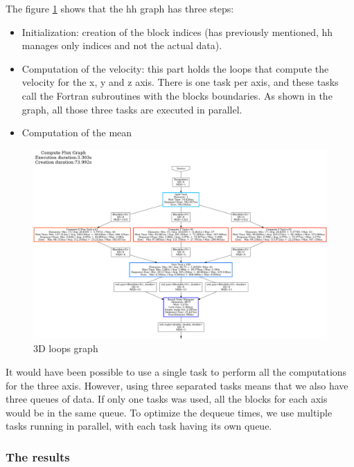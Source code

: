 The figure \ref{fig:loopsgraph} shows that the \gls{hh} graph has three steps:

\begin{itemize}
  \item Initialization: creation of the block indices (has previously
    mentioned, \gls{hh} manages only indices and not the actual data).
  \item Computation of the velocity: this part holds the loops that compute the
    velocity for the x, y and z axis. There is one task per axis, and these
    tasks call the Fortran subroutines with the blocks boundaries. As shown in
    the graph, all those three tasks are executed in parallel.
  \item Computation of the mean
\end{itemize}
\clearpage{}

\begin{figure}[h!]
  \begin{center}
    \includegraphics[scale=0.2]{img/fds-loops/graph-61.png}
    \caption{3D loops graph}
    \label{fig:loopsgraph}
  \end{center}
\end{figure}

It would have been possible to use a single task to perform all the computations
for the three axis. However, using three separated tasks means that we also have
three queues of data. If only one tasks was used, all the blocks for each axis
would be in the same queue. To optimize the dequeue times, we use multiple tasks
running in parallel, with each task having its own queue.

\subsubsection{The results}

